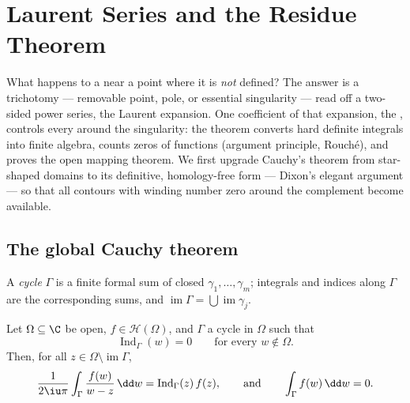 \chapter{Laurent Series and the Residue Theorem}
\label{ch:b3:residues}

What happens to a  near a point where it
is \emph{not} defined? The answer is a  trichotomy ---
removable point, pole, or essential singularity --- read off a
two-sided power series, the Laurent expansion. One coefficient
of that expansion, the \emph{}, controls every  around the singularity: the  theorem converts
hard definite integrals into finite algebra, counts zeros of
functions (argument principle, Rouch\'e), and proves the open
mapping theorem. We first upgrade Cauchy's theorem from
star-shaped domains to its definitive, homology-free form ---
Dixon's elegant argument --- so that all contours with
winding number zero around the complement become available.

\section{The global Cauchy theorem}

A \emph{cycle} $\Gamma$ is a finite formal sum of
closed  $\gamma_1, \dots, \gamma_m$; integrals and
indices along $\Gamma$ are the corresponding sums, and
$\operatorname{im}\Gamma = \bigcup\operatorname{im}\gamma_j$.

\begin{theorem}
\label{thm:b3:residues:globalcauchy}
Let $\Omega \subseteq \C$ be open, $f \in \mathcal H(\Omega)$,
and $\Gamma$ a cycle in $\Omega$ such that
\[
\operatorname{Ind}_\Gamma(w) = 0
\qquad\text{for every } w \notin \Omega .
\]
Then, for all $z \in \Omega\setminus\operatorname{im}\Gamma$,
\[
\frac1{2\iu\pi}\int_\Gamma\frac{f(w)}{w - z}\,\dd w =
\operatorname{Ind}_\Gamma(z)\,f(z),
\qquad\text{and}\qquad
\int_\Gamma f(w)\,\dd w = 0 .
\]
\end{theorem}

